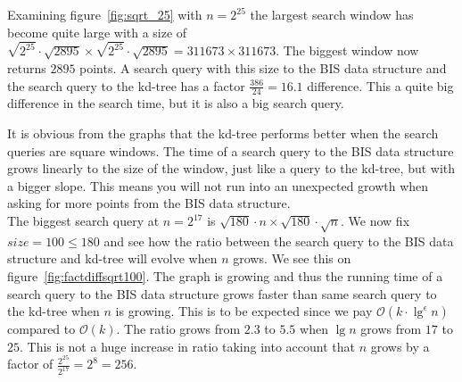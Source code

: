
Examining figure~\ref{fig:sqrt_25} with $n = 2^{25}$ the largest search window has become quite large with a size of $\sqrt{2^{25}}\cdot\sqrt{2895} \times \sqrt{2^{25}}\cdot\sqrt{2895} = 311673 \times 311673$. The biggest window now returns $2895$ points. A search query with this size to the BIS data structure and the search query to the kd-tree has a factor $\frac{386}{24} = 16.1$ difference. This a quite big difference in the search time, but it is also a big search query.

It is obvious from the graphs that the kd-tree performs better when the search queries are square windows. The time of a search query to the BIS data structure grows linearly to the size of the window, just like a query to the kd-tree, but with a bigger slope. This means you will not run into an unexpected growth when asking for more points from the BIS data structure. \\

The biggest search query at $n = 2^{17}$ is $\sqrt{180}\cdot{n} \times \sqrt{180}\cdot\sqrt{n}$. We now fix $size = 100 \leq 180$ and see how the ratio between the search query to the BIS data structure and kd-tree will evolve when $n$ grows. We see this on figure~\ref{fig:factdiffsqrt100}. The graph is growing and thus the running time of a search query to the BIS data structure grows faster than same search query to the kd-tree when $n$ is growing. This is to be expected since we pay $\mathcal{O}(k\cdot\lg^\epsilon n)$ compared to $\mathcal{O}(k)$. The ratio grows from $2.3$ to $5.5$ when $\lg n$ grows from $17$ to $25$. This is not a huge increase in ratio taking into account that $n$ grows by a factor of $\frac{2^{25}}{2^{17}} = 2^8 = 256$.

